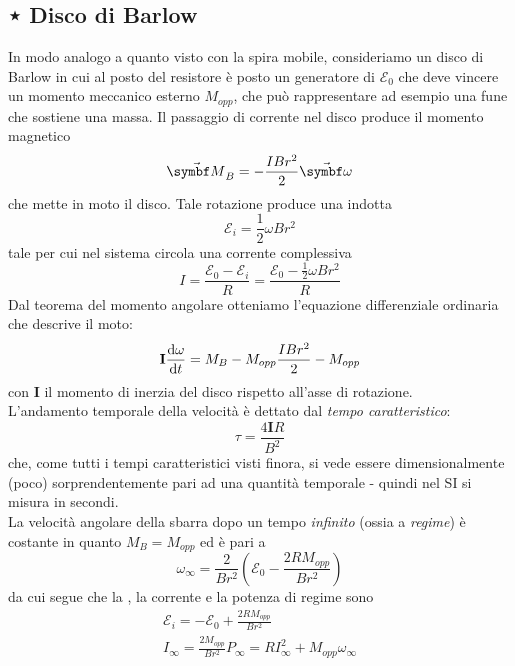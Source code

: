 \subsection{⋆ Disco di  Barlow}
In modo analogo a quanto visto con la spira mobile, consideriamo un disco di Barlow in cui al posto del resistore è posto un generatore di \fem $\mathcal{E}_0$ che deve vincere un momento meccanico esterno $M_{opp}$, che può rappresentare ad esempio una fune che sostiene una massa. Il passaggio di corrente nel disco produce il momento magnetico
\begin{equation*}
	\vba{M}_B=-\frac{IBr^2}{2}\vba{\omega}
\end{equation*}
che mette in moto il disco. Tale rotazione produce una \fem indotta
\begin{equation*}
	\mathcal{E}_i=\frac{1}{2}\omega Br^2
\end{equation*}
tale per cui nel sistema circola una corrente complessiva
\begin{equation*}
	I=\frac{\mathcal{E}_0-\mathcal{E}_i}{R}=\frac{\mathcal{E}_0-\frac{1}{2}\omega Br^2}{R}
\end{equation*}
Dal teorema del momento angolare otteniamo l'equazione differenziale ordinaria che descrive il moto:
\begin{equation*}
	\mathbf{I}\dv{\omega}{t}=M_B-M_{opp}\frac{IBr^2}{2}-M_{opp}
\end{equation*}
con $\mathbf{I}$ il momento di inerzia del disco rispetto all'asse di rotazione.\\
L'andamento temporale della velocità è dettato dal \textit{tempo caratteristico}:
\begin{equation}
	\tau=\frac{4\mathbf{I}R}{B^2}
\end{equation}
che, come tutti i tempi caratteristici visti finora, si vede essere dimensionalmente (poco) sorprendentemente pari ad una quantità temporale - quindi nel SI si misura in secondi.\\
La velocità angolare della sbarra dopo un tempo \textit{infinito} (ossia a \textit{regime}) è costante in quanto $M_B=M_{opp}$ ed è pari a
\begin{equation}
	\omega_{\infty}=\frac{2}{Br^2}\left(\mathcal{E}_0-\frac{2RM_{opp}}{Br^2}\right)
\end{equation}
da cui segue che la \fem, la corrente e la potenza di regime sono
\begin{gather}
	\mathcal{E}_i=-\mathcal{E}_0+\frac{2R M_{opp}}{Br^2}\\
	I_{\infty}=\frac{2M_{opp}}{Br^2}
	P_{\infty}=RI_{\infty}^2+M_{opp}\omega_{\infty}
\end{gather}
